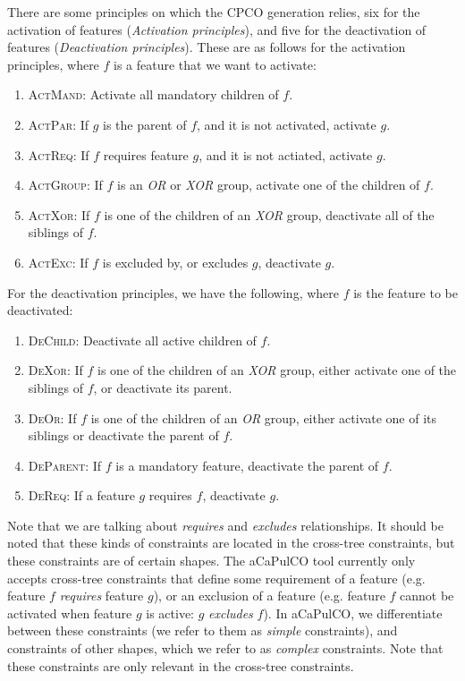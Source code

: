 There are some principles on which the CPCO generation relies, six for the
activation of features (\emph{Activation principles}), and five for the
deactivation of features (\emph{Deactivation principles}). These are as follows
for the activation principles, where $f$ is a feature that we want to activate:
\begin{enumerate}
    \item \textsc{ActMand}: Activate all mandatory children of $f$.
    \item \textsc{ActPar}: If $g$ is the parent of $f$, and it is not activated, activate $g$.
    \item \textsc{ActReq}: If $f$ requires feature $g$, and it is not actiated, activate $g$.
    \item \textsc{ActGroup}: If $f$ is an \emph{OR} or \emph{XOR} group, activate one of the children of $f$.
    \item \textsc{ActXor}: If $f$ is one of the children of an \emph{XOR} group, deactivate all of the siblings of $f$.
    \item \textsc{ActExc}: If $f$ is excluded by, or excludes $g$, deactivate $g$.
\end{enumerate}

For the deactivation principles, we have the following, where $f$ is the feature
to be deactivated:
\begin{enumerate}
    \item \textsc{DeChild}: Deactivate all active children of $f$.
    \item \textsc{DeXor}: If $f$ is one of the children of an \emph{XOR} group, either activate one of the siblings of $f$, or deactivate its parent.
    \item \textsc{DeOr}: If $f$ is one of the children of an \emph{OR} group, either activate one of its siblings or deactivate the parent of $f$.
    \item \textsc{DeParent}: If $f$ is a mandatory feature, deactivate the parent of $f$.
    \item \textsc{DeReq}: If a feature $g$ requires $f$, deactivate $g$.
\end{enumerate}

Note that we are talking about \emph{requires} and \emph{excludes} relationships.
It should be noted that these kinds of constraints are located in the cross-tree
constraints, but these constraints are of certain shapes. The aCaPulCO tool
currently only accepts cross-tree constraints that define some requirement of a
feature (e.g. feature $f$ \emph{requires} feature $g$), or an exclusion of a
feature (e.g. feature $f$ cannot be activated when feature $g$ is active: 
$g$ \emph{excludes} $f$). In aCaPulCO, we differentiate between these constraints
(we refer to them as \emph{simple} constraints), and constraints of other shapes,
which we refer to as \emph{complex} constraints. Note that these constraints are
only relevant in the cross-tree constraints.

